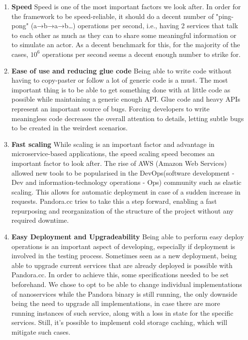 \begin{enumerate}
\item \textbf{Speed} Speed is one of the most important factors we look after. In order for the framework to be speed-reliable, it should do a decent number of "ping-pong" (a→b→a→b…) operations per second, i.e., having 2 services that talk to each other as much as they can to share some meaningful information or to simulate an actor. As a decent benchmark for this, for the majority of the cases, $10^6$ operations per second seems a decent enough number to strike for. 

\item \textbf{Ease of use and reducing glue code} Being able to write code without having to copy-paster or follow a lot of generic code is a must. The most important thing is to be able to get something done with at little code as possible while maintaining a generic enough API. Glue code and heavy APIs represent an important source of bugs. Forcing developers to write meaningless code decreases the overall attention to details, letting subtle bugs to be created in the weirdest scenarios.

\item \textbf{Fast scaling} While scaling is an important factor and advantage in microservice-based applications, the speed scaling speed becomes an important factor to look after. The rise of AWS (Amazon Web Services) allowed new tools to be popularised in the DevOps(software development - Dev and information-technology operations - Ops) community such as elastic scaling. This allows for automatic deployment in case of a sudden increase in requests. Pandora.cc tries to take this a step forward, enabling a fast repurposing and reorganization of the structure of the project without any required downtime.

\item \textbf{Easy Deployment and Upgradeability} Being able to perform easy deploy operations is an important aspect of developing, especially if deployment is involved in the testing process. Sometimes seen as a new deployment, being able to upgrade current services that are already deployed is possible with Pandora.cc. In order to achieve this, some specifications needed to be set beforehand. We chose to opt to be able to change individual implementations of nanoservices while the Pandora binary is still running, the only downside being the need to upgrade all implementations, in case there are more running instances of such service, along with a loss in state for the specific services. Still, it's possible to implement cold storage caching, which will mitigate such cases.


\end{enumerate}
